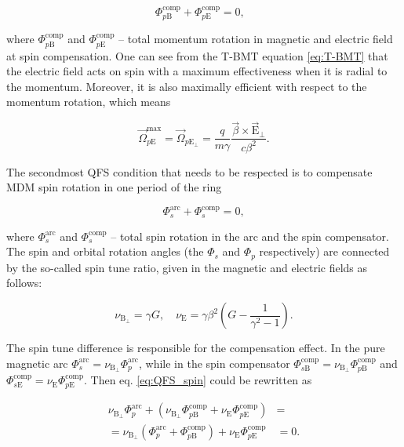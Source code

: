 \documentclass[submitting]{nst}
\begin{document}
\begin{equation}
	\Phi_{p\textrm{B}}^{\textrm{comp}}+{\Phi}_{p\textrm{E}}^{\textrm{comp}} = 0,\ \ \ 
\end{equation}

\noindent where $\Phi_{p\textrm{B}}^{\textrm{comp}}$ and ${\Phi}_{p\textrm{E}}^{\textrm{comp}}$ -- total momentum rotation in magnetic and electric field at spin compensation. One can see from the T-BMT equation \ref{eq:T-BMT} that  the electric field acts on spin with a maximum effectiveness when it is radial to the momentum. Moreover, it is also maximally efficient with respect to the momentum rotation, which means

\begin{equation}
	\vec{\Omega}_{p\mathrm{E}}^{\text{max}} = \vec{\Omega}_{p\mathrm{E}_{\perp}}=\frac{q}{m \gamma} \frac{\vec{\beta} \times \vec{\mathrm{E}}_{\perp}}{c \beta^2}.
\end{equation}

\par The secondmost QFS condition that needs to be respected is to compensate MDM spin rotation in one period of the ring 

\begin{equation}
	\Phi_s^{\textrm{arc}}+\Phi_{s}^{\textrm{comp}}=0,
	\label{eq:QFS_spin}
\end{equation}

\noindent where $\Phi_s^{\textrm{arc}}$ and $\Phi_{s}^{\textrm{comp}}$ -- total spin rotation in the arc and the spin compensator. The spin and orbital rotation angles (the $\Phi_{s}$ and $\Phi_{p}$ respectively) are connected by the so-called spin tune ratio, given in the magnetic and electric fields as follows:

\begin{equation}
	\nu_{\mathrm{B}_{\perp}} = \gamma G, \quad \nu_{\mathrm{E}} = \gamma \beta^2 \left(G-\frac{1}{\gamma^{2}-1}\right).
	\label{eq:spin-tine}
\end{equation} 

 \noindent The spin tune difference is responsible for the compensation effect. In the pure magnetic arc $\Phi_{s}^{\text{arc}} = \nu_{\mathrm{B}_{\perp}}\Phi_{p}^{\text{arc}}$, while in the spin compensator $\Phi_{s\mathrm{B}}^{\text{comp}} = \nu_{\mathrm{B}_{\perp}}\Phi_{p\mathrm{B}}^{\text{comp}}$ and $\Phi_{s\mathrm{E}}^{\text{comp}} = \nu_{\mathrm{E}}\Phi_{p\mathrm{E}}^{\text{comp}}$. Then eq. \ref{eq:QFS_spin} could be rewritten as
 
 \begin{equation}
 	\begin{aligned}
 	\nu_{\mathrm{B}_{\perp}}\Phi_{p}^{\text{arc}} +
 	\left(\nu_{\mathrm{B}_{\perp}}\Phi_{p\mathrm{B}}^{\text{comp}} +
 	\nu_{\mathrm{E}}\Phi_{p\mathrm{E}}^{\text{comp}} \right) & = \\
 	= \nu_{\mathrm{B}_{\perp}} \left( 
 	\Phi_{p}^{\text{arc}} +
 	\Phi_{p\mathrm{B}}^{\text{comp}} \right) +
 	\nu_{\mathrm{E}}\Phi_{p\mathrm{E}}^{\text{comp}}  & = 0.
 	\label{eq:deflection}
 	\end{aligned}
 \end{equation}
  
\end{document}
